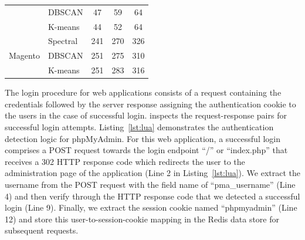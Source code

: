 \begin{table}[t]
\begin{adjustbox}{max width=0.8\columnwidth}
\begin{tabular}{|l|l|lll|}
                                                                                         & DBSCAN                                                                                   & \multicolumn{1}{c|}{47}           & \multicolumn{1}{c|}{59}              & \multicolumn{1}{c|}{64}           \\ \cline{2-5} 
                                                                                         & K-means                                                                                  & \multicolumn{1}{c|}{44}           & \multicolumn{1}{c|}{52}              & \multicolumn{1}{c|}{64}           \\ \hline
    \multirow{3}{*}{Magento}                                                             & Spectral                                                                                 & \multicolumn{1}{c|}{241}          & \multicolumn{1}{c|}{270}             & \multicolumn{1}{c|}{326}          \\ \cline{2-5} 
                                                                                         & DBSCAN                                                                                   & \multicolumn{1}{c|}{251}          & \multicolumn{1}{c|}{275}             & \multicolumn{1}{c|}{310}          \\ \cline{2-5} 
                                                                                         & K-means                                                                                  & \multicolumn{1}{c|}{251}          & \multicolumn{1}{c|}{283}             & \multicolumn{1}{c|}{316}          \\ \hline
\end{tabular}
\end{adjustbox}
\end{table}

The login procedure for web applications consists of a request containing the credentials followed by the server response assigning the authentication cookie to the users in the case of successful login. 
\dbltr{} inspects the request-response pairs for successful login attempts. 
Listing~\ref{lst:lua} demonstrates the authentication detection logic for phpMyAdmin. 
For this web application, a successful login comprises a POST request towards the login endpoint ``/'' or ``index.php'' that receives a 302 HTTP response code which redirects the user to the administration page of the application (Line 2 in Listing~\ref{lst:lua}). 
We extract the username from the POST request with the field name of ``pma\_username'' (Line 4) and then verify through the HTTP response code that we detected a successful login (Line 9). Finally, we extract the session cookie named ``phpmyadmin'' (Line 12) and store this user-to-session-cookie mapping in the Redis data store for subsequent requests. 

